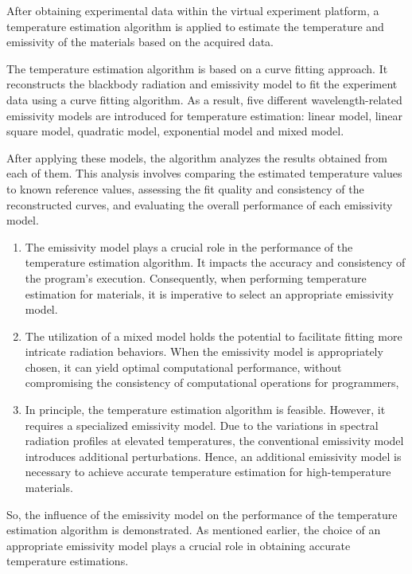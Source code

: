 After obtaining experimental data within the virtual experiment platform, a temperature estimation 
algorithm is applied to estimate the temperature and emissivity of the materials based on the 
acquired data.


The temperature estimation algorithm is based on a curve fitting approach. It reconstructs 
the blackbody radiation and emissivity model to fit the experiment data using a curve fitting 
algorithm. As a result, five different wavelength-related emissivity models are introduced for temperature 
estimation: linear model, linear square model, quadratic model, exponential model and mixed model. 


After applying these models, the algorithm analyzes the results obtained from each of them. 
This analysis involves comparing the estimated temperature values to known reference values, 
assessing the fit quality and consistency of the reconstructed curves, and evaluating the overall performance 
of each emissivity model.

\begin{enumerate}

\item The emissivity model plays a crucial role in the performance of the temperature estimation algorithm. It impacts the accuracy and consistency of the program's execution. Consequently, when performing temperature estimation for materials, it is imperative to select an appropriate emissivity model.


\item The utilization of a mixed model holds the potential to facilitate fitting more intricate radiation behaviors. When the emissivity model is appropriately chosen, it can yield optimal computational performance, without compromising the consistency of computational operations for programmers,

\item In principle, the temperature estimation algorithm is feasible. However, it requires a specialized emissivity model. Due to the variations in spectral radiation profiles at elevated temperatures, the conventional emissivity model introduces additional perturbations. Hence, an additional emissivity model is necessary to achieve accurate temperature estimation for high-temperature materials.
\end{enumerate}

So, the influence of the emissivity model on the performance of the temperature 
estimation algorithm is demonstrated. As mentioned earlier, the choice of an appropriate 
emissivity model plays a crucial role in obtaining accurate temperature estimations.

